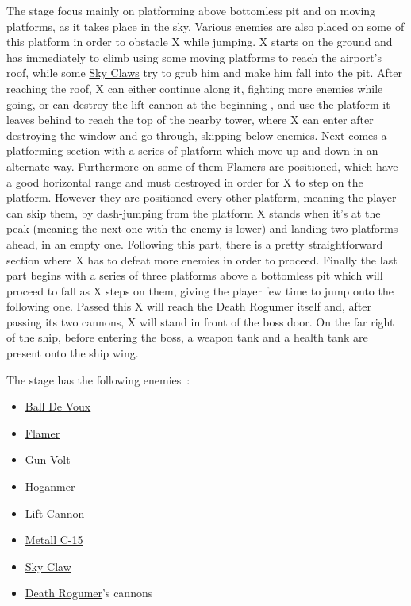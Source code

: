 The stage focus mainly on platforming above bottomless pit and on moving platforms, as it takes place in the sky. Various enemies are also placed on some of this platform in order to obstacle X while jumping. X starts on the ground and has immediately to climb using some moving platforms to reach the airport's roof, while some \hyperlink{enem:Sky_Claw}{Sky Claws} try to grub him and make him fall into the pit. After reaching the roof, X can either continue along it, fighting more enemies while going, or can destroy the lift cannon at the beginning , and use the platform it leaves behind to reach the top of the nearby tower, where X can enter after destroying the window and go through, skipping below enemies. Next comes a platforming section with a series of platform which move up and down in an alternate way. Furthermore on some of them \hyperlink{enem:Flamer}{Flamers} are positioned, which have a good horizontal range and must destroyed in order for X to step on the platform. However they are positioned every other platform, meaning the player can skip them, by dash-jumping from the platform X stands when it's at the peak (meaning the next one with the enemy is lower) and landing two platforms ahead, in an empty one. Following this part, there is a pretty straightforward section where X has to defeat more enemies in order to proceed. Finally the last part begins with a series of three platforms above a bottomless pit which will proceed to fall as X steps on them, giving the player few time to jump onto the following one. Passed this X will reach the Death Rogumer itself and, after passing its two cannons, X will stand in front of the boss door. On the far right of the ship, before entering the boss, a weapon tank and a health tank are present onto the ship wing.

The stage has the following enemies~\cite{wiki:Airport}:
\begin{itemize}
	\item \hyperlink{enem:Ball_De_Voux}{Ball De Voux }
	\item \hyperlink{enem:Flamer}{Flamer}
	\item \hyperlink{enem:Gun_Volt}{Gun Volt}
	\item \hyperlink{enem:Hoganmer}{Hoganmer}
	\item \hyperlink{enem:Lift_Cannon}{Lift Cannon}
	\item \hyperlink{enem:Metall_C-15}{Metall C-15}
	\item \hyperlink{enem:Sky_Claw}{Sky Claw}
	\item \hyperlink{veichle:Death_Rogumer}{Death Rogumer}'s cannons
\end{itemize}

